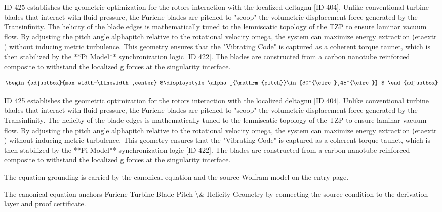 ID 425 establishes the geometric optimization for the rotors interaction with the localized deltagnu [ID 404]. Unlike conventional turbine blades that interact with fluid pressure, the Furiene blades are pitched to "scoop" the volumetric displacement force generated by the Transinfinity. The helicity of the blade edges is mathematically tuned to the lemniscatic topology of the TZP to ensure laminar vacuum flow. By adjusting the pitch angle alphapitch relative to the rotational velocity omega, the system can maximize energy extraction (etaextr ) without inducing metric turbulence. This geometry ensures that the "Vibrating Code" is captured as a coherent torque taunet, which is then stabilized by the **Pi Model** synchronization logic [ID 422]. The blades are constructed from a carbon nanotube reinforced composite to withstand the localized g forces at the singularity interface.

\[
\begin{adjustbox}{max width=\linewidth,center}
$\displaystyle
\alpha_{\mathrm{pitch}}\in[30^{\circ},45^{\circ}]
$
\end{adjustbox}
\]

ID 425 establishes the geometric optimization for the rotors interaction with the localized deltagnu [ID 404]. Unlike conventional turbine blades that interact with fluid pressure, the Furiene blades are pitched to "scoop" the volumetric displacement force generated by the Transinfinity. The helicity of the blade edges is mathematically tuned to the lemniscatic topology of the TZP to ensure laminar vacuum flow. By adjusting the pitch angle alphapitch relative to the rotational velocity omega, the system can maximize energy extraction (etaextr ) without inducing metric turbulence. This geometry ensures that the "Vibrating Code" is captured as a coherent torque taunet, which is then stabilized by the **Pi Model** synchronization logic [ID 422]. The blades are constructed from a carbon nanotube reinforced composite to withstand the localized g forces at the singularity interface.

The equation grounding is carried by the canonical equation and the source Wolfram model on the entry page.

The canonical equation anchors Furiene Turbine Blade Pitch \textbackslash{}\& Helicity Geometry by connecting the source condition to the derivation layer and proof certificate.

